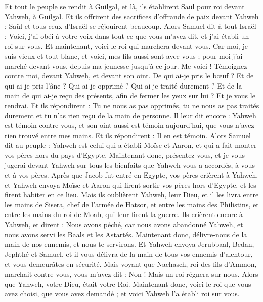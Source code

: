 \begin{multicols}{2}
Et tout le peuple se rendit à Guilgal, et là, ils établirent Saül pour roi devant Yahweh, à Guilgal. Et ils offrirent des sacrifices d’offrande de paix devant Yahweh ; Saül et tous ceux d'Israël se réjouirent beaucoup.
\VerseOne{}Alors Samuel dit à tout Israël : Voici, j'ai obéi à votre voix dans tout ce que vous m'avez dit, et j'ai établi un roi sur vous.
Et maintenant, voici le roi qui marchera devant vous. Car moi, je suis vieux et tout blanc, et voici, mes fils aussi sont avec vous ; pour moi j'ai marché devant vous, depuis ma jeunesse jusqu’à ce jour.
Me voici ! Témoignez contre moi, devant Yahweh, et devant son oint. De qui ai-je pris le bœuf ? Et de qui ai-je pris l'âne ? Qui ai-je opprimé ? Qui ai-je traité durement ? Et de la main de qui ai-je reçu des présents, afin de fermer les yeux sur lui ? Et je vous le rendrai.
Et ils répondirent : Tu ne nous as pas opprimés, tu ne nous as pas traités durement et tu n'as rien reçu de la main de personne.
Il leur dit encore : Yahweh est témoin contre vous, et son oint aussi est témoin aujourd'hui, que vous n'avez rien trouvé entre mes mains. Et ils répondirent : Il en est témoin.
Alors Samuel dit au peuple : Yahweh est celui qui a établi Moïse et Aaron, et qui a fait monter vos pères hors du pays d'Egypte.
Maintenant donc, présentez-vous, et je vous jugerai devant Yahweh sur tous les bienfaits que Yahweh vous a accordés, à vous et à vos pères.
Après que Jacob fut entré en Egypte, vos pères crièrent à Yahweh, et Yahweh envoya Moïse et Aaron qui firent sortir vos pères hors d'Egypte, et les firent habiter en ce lieu.
Mais ils oublièrent Yahweh, leur Dieu, et il les livra entre les mains de Sisera, chef de l'armée de Hatsor, et entre les mains des Philistins, et entre les mains du roi de Moab, qui leur firent la guerre.
Ils crièrent encore à Yahweh, et dirent : Nous avons péché, car nous avons abandonné Yahweh, et nous avons servi les Baals et les Astartés. Maintenant donc, délivre-nous de la main de nos ennemis, et nous te servirons.
Et Yahweh envoya Jerubbaal, Bedan, Jephthé et Samuel, et il vous délivra de la main de tous vos ennemis d'alentour, et vous demeurâtes en sécurité.
Mais voyant que Nachasch, roi des fils d’Ammon, marchait contre vous, vous m'avez dit : Non ! Mais un roi régnera sur nous. Alors que Yahweh, votre Dieu, était votre Roi.
Maintenant donc, voici le roi que vous avez choisi, que vous avez demandé ; et voici Yahweh l'a établi roi sur vous.

\end{multicols}
